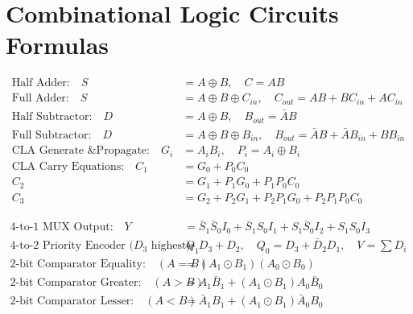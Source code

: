 \chapter{Combinational Logic Circuits Formulas}

\begin{formulabox}
\begin{align}
\text{Half Adder:} \quad S &= A \oplus B, \quad C = AB \\
\text{Full Adder:} \quad S &= A \oplus B \oplus C_{in}, \quad C_{out} = AB + BC_{in} + AC_{in} \\
\text{Half Subtractor:} \quad D &= A \oplus B, \quad B_{out} = \bar{A}B \\
\text{Full Subtractor:} \quad D &= A \oplus B \oplus B_{in}, \quad B_{out} = \bar{A}B + \bar{A}B_{in} + BB_{in} \\
\text{CLA Generate \& Propagate:} \quad G_i &= A_i B_i, \quad P_i = A_i \oplus B_i \\
\text{CLA Carry Equations:} \quad C_1 &= G_0 + P_0 C_0 \\
C_2 &= G_1 + P_1 G_0 + P_1 P_0 C_0 \\
C_3 &= G_2 + P_2 G_1 + P_2 P_1 G_0 + P_2 P_1 P_0 C_0
\end{align}
\end{formulabox}

\begin{formulabox}
\begin{align}
\text{4-to-1 MUX Output:} \quad Y &= \bar{S}_1\bar{S}_0 I_0 + \bar{S}_1 S_0 I_1 + S_1\bar{S}_0 I_2 + S_1 S_0 I_3 \\
\text{4-to-2 Priority Encoder ($D_3$ highest):} \quad Q_1 &= D_3 + D_2, \quad Q_0 = D_3 + \bar{D}_2 D_1, \quad V = \sum D_i \\
\text{2-bit Comparator Equality:} \quad (A=B) &= (A_1 \odot B_1)(A_0 \odot B_0) \\
\text{2-bit Comparator Greater:} \quad (A>B) &= A_1 \bar{B}_1 + (A_1 \odot B_1) A_0 \bar{B}_0 \\
\text{2-bit Comparator Lesser:} \quad (A<B) &= \bar{A}_1 B_1 + (A_1 \odot B_1) \bar{A}_0 B_0
\end{align}
\end{formulabox}

